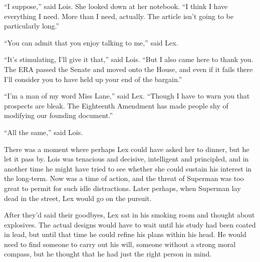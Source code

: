 ``I suppose,'' said Lois. She looked down at her notebook. ``I think I
have everything I need. More than I need, actually. The article isn't
going to be particularly long.''

``You can admit that you enjoy talking to me,'' said Lex.

``It's stimulating, I'll give it that,'' said Lois. ``But I also came
here to thank you. The ERA passed the Senate and moved onto the House,
and even if it fails there I'll consider you to have held up your end of
the bargain.''

``I'm a man of my word Miss Lane,'' said Lex. ``Though I have to warn
you that prospects are bleak. The Eighteenth Amendment has made people
shy of modifying our founding document.''

``All the same,'' said Lois.

There was a moment where perhaps Lex could have asked her to dinner, but
he let it pass by. Lois was tenacious and decisive, intelligent and
principled, and in another time he might have tried to see whether she
could sustain his interest in the long‐term. Now was a time of action,
and the threat of Superman was too great to permit for such idle
distractions. Later perhaps, when Superman lay dead in the street, Lex
would go on the pursuit.

After they'd said their goodbyes, Lex sat in his smoking room and
thought about explosives. The actual designs would have to wait until
his study had been coated in lead, but until that time he could refine
his plans within his head. He would need to find someone to carry out
his will, someone without a strong moral compass, but he thought that he
had just the right person in mind.
